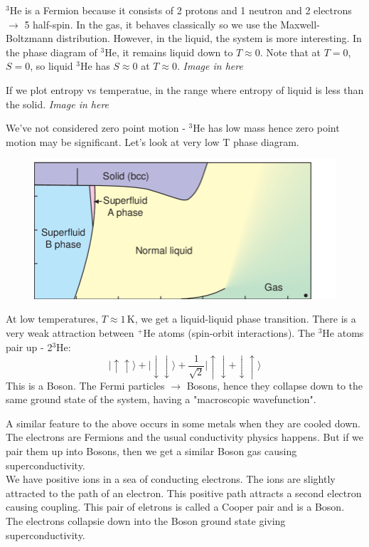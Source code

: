 \documentclass[a4paper, 11pt, normalem]{report}
\begin{document}
\begin{example}
    $^3$He is a Fermion because it consists of 2 protons and 1 neutron and 2 electrons $\to$ 5 half-spin. 
    In the gas, it behaves classically so we use the Maxwell-Boltzmann distribution. However, in the liquid, the system is more interesting. 
    In the phase diagram of $^3$He, it remains liquid down to $T \approx 0$. 
    Note that at $T=0$, $S=0$, so liquid $^3$He has $S\approx0$ at $T\approx0$.
    \emph{Image in here}

    If we plot entropy vs temperatue, in the range where entropy of liquid is less than the solid. 
    \emph{Image in here}

    We've not considered zero point motion - $^3$He has low mass hence zero point motion may be significant. 
    Let's look at very low T phase diagram.
    \begin{figure}[H]
        \centering
        \includegraphics[scale=0.5]{he3.png}
    \end{figure}

    At low temperatures, $T\approx1\,$K, we get a liquid-liquid phase transition. 
    There is a very weak attraction between $^+$He atoms (spin-orbit interactions).
    The $^3$He atoms pair up - 2$^3$He:
    \begin{equation}
        |\uparrow\uparrow\rangle + |\downarrow\downarrow\rangle + \frac{1}{\sqrt{2}}|\uparrow\downarrow + \downarrow\uparrow\rangle
    \end{equation}
    This is a Boson.
    The Fermi particles $\to$ Bosons, hence they collapse down to the same ground state of the system, having a "macroscopic wavefunction".
\end{example}

A similar feature to the above occurs in some metals when they are cooled down. 
The electrons are Fermions and the usual conductivity physics happens. 
But if we pair them up into Bosons, then we get a similar Boson gas causing superconductivity. \\
We have positive ions in a sea of conducting electrons. 
The ions are slightly attracted to the path of an electron.
This positive path attracts a second electron causing coupling. 
This pair of eletrons is called a Cooper pair and is a Boson.
The electrons collapsie down into the Boson ground state giving superconductivity.
\end{document}
